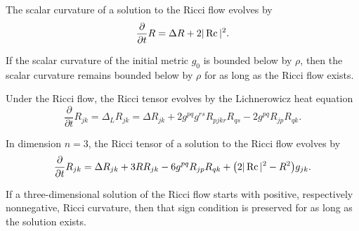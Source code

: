 \begin{lemma}
\label{ch06-lem-scalar-curvature-under-ricci-flow}
The scalar curvature of a solution to the Ricci flow evolves by
\[
\frac{\partial}{\partial t}R=\Delta R+2|\operatorname{Rc}|^2.
\]
\end{lemma}

\begin{lemma}
\label{ch06-lem-preservation-scalar-lower-bounds}
If the scalar curvature of the initial metric \(g_0\) is bounded below by \(\rho\), then the scalar curvature remains bounded below by \(\rho\) for as long as the Ricci flow exists.
\end{lemma}

\begin{lemma}
\label{ch06-lem-ricci-evolution-general-dimension}
Under the Ricci flow, the Ricci tensor evolves by the Lichnerowicz heat equation
\[
\frac{\partial}{\partial t}R_{jk}=\Delta_L R_{jk}=\Delta R_{jk}+2g^{pq}g^{rs}R_{pjkr}R_{qs}-2g^{pq}R_{jp}R_{qk}.
\]
\end{lemma}

\begin{lemma}
\label{ch06-lem-ricci-evolution-dimension-three}
In dimension \(n=3\), the Ricci tensor of a solution to the Ricci flow evolves by
\[
\frac{\partial}{\partial t}R_{jk}=\Delta R_{jk}+3RR_{jk}-6g^{pq}R_{jp}R_{qk}+\bigl(2|\operatorname{Rc}|^2-R^2\bigr)g_{jk}.
\]
\end{lemma}

\begin{corollary}
\label{ch06-cor-preservation-ricci-sign-three}
If a three-dimensional solution of the Ricci flow starts with positive, respectively nonnegative, Ricci curvature, then that sign condition is preserved for as long as the solution exists.
\end{corollary}

